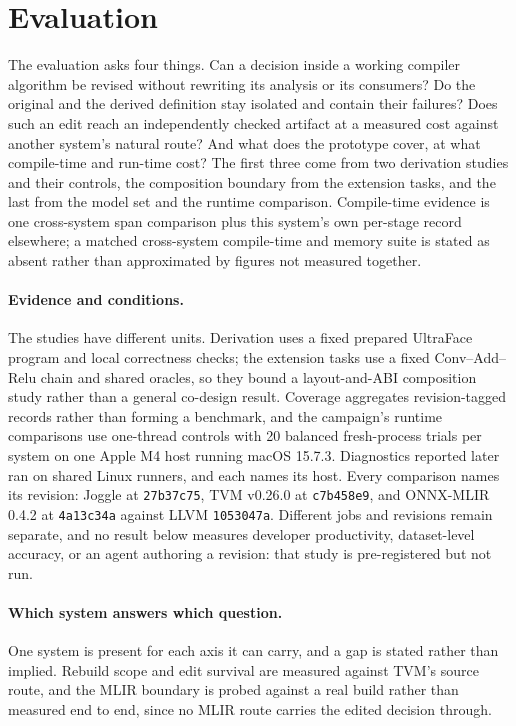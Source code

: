 \documentclass[sigplan,anonymous,review]{acmart}
\begin{document}
\section{Evaluation}
The evaluation asks four things. Can a decision inside a working compiler
algorithm be revised without rewriting its analysis or its consumers? Do the
original and the derived definition stay isolated and contain their failures?
Does such an edit reach an independently checked artifact at a measured cost
against another system's natural route? And what does the prototype cover, at
what compile-time and run-time cost? The first three
come from two derivation studies and their controls, the composition boundary
from the extension tasks, and the last from the model set and the runtime
comparison. Compile-time evidence is one cross-system span comparison plus this system's own
per-stage record elsewhere; a matched cross-system compile-time and memory suite
is stated as absent rather than approximated by figures not measured together.

\paragraph{Evidence and conditions.}
The studies have different units. Derivation uses a fixed prepared UltraFace
program and local correctness checks; the extension tasks use a fixed
Conv--Add--Relu chain and shared oracles, so they bound a layout-and-ABI
composition study rather than a general co-design result. Coverage aggregates
revision-tagged records rather than forming a benchmark, and the campaign's runtime
comparisons use one-thread controls with 20 balanced fresh-process trials per
system on one Apple M4 host running macOS 15.7.3. Diagnostics reported later ran
on shared Linux runners, and each names its host.
Every comparison names its revision: Joggle at \texttt{27b37c75}, TVM v0.26.0 at
\texttt{c7b458e9}, and ONNX-MLIR 0.4.2 at \texttt{4a13c34a} against LLVM
\texttt{1053047a}. Different jobs and
revisions remain separate, and no result below measures developer productivity,
dataset-level accuracy, or an agent authoring a revision: that study is
pre-registered but not run.

\paragraph{Which system answers which question.}
One system is present for each axis it can carry, and a gap is stated rather
than implied. Rebuild scope and edit survival are measured against TVM's source
route, and the MLIR boundary is probed against a real build rather than
measured end to end, since no MLIR route carries the edited decision through.
\end{document}
